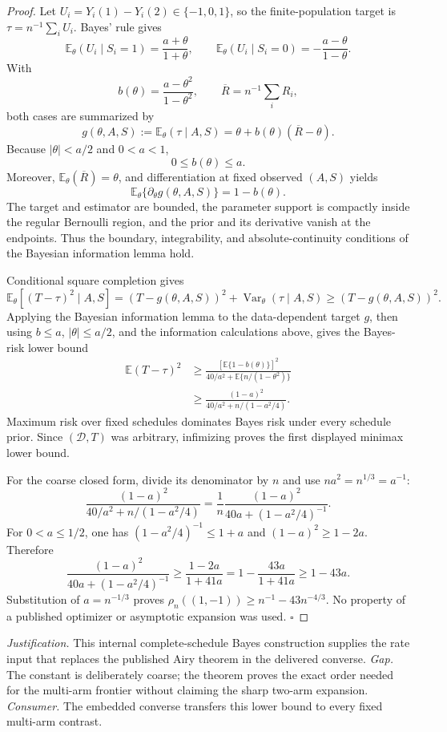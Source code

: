 \documentclass{article}
\begin{document}
\begin{proof}
Let \(U_i=Y_i(1)-Y_i(2)\in\{-1,0,1\}\), so the finite-population target is \(\tau=n^{-1}\sum_iU_i\). Bayes' rule gives
\[
 \mathbb E_\theta(U_i\mid S_i=1)=\frac{a+\theta}{1+\theta},
 \qquad
 \mathbb E_\theta(U_i\mid S_i=0)=-\frac{a-\theta}{1-\theta}.
\]
With
\[
 b(\theta)=\frac{a-\theta^2}{1-\theta^2},
 \qquad
 \overline R=n^{-1}\sum_iR_i,
\]
both cases are summarized by
\[
 g(\theta,A,S):=\mathbb E_\theta(\tau\mid A,S)
 =\theta+b(\theta)(\overline R-\theta).
\]
Because \(|\theta|<a/2\) and \(0<a<1\),
\[
 0\leq b(\theta)\leq a.
\]
Moreover, \(\mathbb E_\theta(\overline R)=\theta\), and differentiation at fixed observed \((A,S)\) yields
\[
 \mathbb E_\theta\{\partial_\theta g(\theta,A,S)\}
 =1-b(\theta).
\]
The target and estimator are bounded, the parameter support is compactly inside the regular Bernoulli region, and the prior and its derivative vanish at the endpoints. Thus the boundary, integrability, and absolute-continuity conditions of the Bayesian information lemma hold.

Conditional square completion gives
\[
 \mathbb E_\theta[(T-\tau)^2\mid A,S]
 =(T-g(\theta,A,S))^2+\operatorname{Var}_\theta(\tau\mid A,S)
 \geq(T-g(\theta,A,S))^2.
\]
Applying the Bayesian information lemma to the data-dependent target \(g\), then using \(b\leq a\), \(|\theta|\leq a/2\), and the information calculations above, gives the Bayes-risk lower bound
\[
 \begin{aligned}
 \mathbb E(T-\tau)^2
 &\geq
 \frac{\left[\mathbb E\{1-b(\theta)\}\right]^2}
 {40/a^2+\mathbb E\{n/(1-\theta^2)\}}\\
 &\geq\frac{(1-a)^2}{40/a^2+n/(1-a^2/4)}.
 \end{aligned}
\]
Maximum risk over fixed schedules dominates Bayes risk under every schedule prior. Since \((\mathcal D,T)\) was arbitrary, infimizing proves the first displayed minimax lower bound.

For the coarse closed form, divide its denominator by \(n\) and use \(na^2=n^{1/3}=a^{-1}\):
\[
 \frac{(1-a)^2}{40/a^2+n/(1-a^2/4)}
 =\frac1n\frac{(1-a)^2}{40a+(1-a^2/4)^{-1}}.
\]
For \(0<a\leq1/2\), one has \((1-a^2/4)^{-1}\leq1+a\) and \((1-a)^2\geq1-2a\). Therefore
\[
 \frac{(1-a)^2}{40a+(1-a^2/4)^{-1}}
 \geq\frac{1-2a}{1+41a}
 =1-\frac{43a}{1+41a}
 \geq1-43a.
\]
Substitution of \(a=n^{-1/3}\) proves \(\rho_n((1,-1))\geq n^{-1}-43n^{-4/3}\). No property of a published optimizer or asymptotic expansion was used. \(\square\)
\end{proof}
\par\smallskip\noindent \textit{Justification.} This internal complete-schedule Bayes construction supplies the rate input that replaces the published Airy theorem in the delivered converse. \textit{Gap.} The constant is deliberately coarse; the theorem proves the exact order needed for the multi-arm frontier without claiming the sharp two-arm expansion. \textit{Consumer.} The embedded converse transfers this lower bound to every fixed multi-arm contrast.
\end{document}
